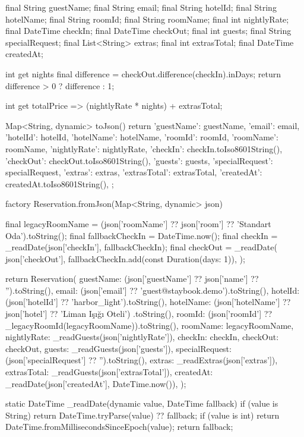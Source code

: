 \documentclass[11pt,a4paper]{article}
\begin{document}
\begin{codeblock}
{  final String guestName;
  final String email;
  final String hotelId;
  final String hotelName;
  final String roomId;
  final String roomName;
  final int nightlyRate;
  final DateTime checkIn;
  final DateTime checkOut;
  final int guests;
  final String specialRequest;
  final List<String> extras;
  final int extrasTotal;
  final DateTime createdAt;

  int get nights {
    final difference = checkOut.difference(checkIn).inDays;
    return difference > 0 ? difference : 1;
  }

  int get totalPrice => (nightlyRate * nights) + extrasTotal;

  Map<String, dynamic> toJson() {
    return {
      'guestName': guestName,
      'email': email,
      'hotelId': hotelId,
      'hotelName': hotelName,
      'roomId': roomId,
      'roomName': roomName,
      'nightlyRate': nightlyRate,
      'checkIn': checkIn.toIso8601String(),
      'checkOut': checkOut.toIso8601String(),
      'guests': guests,
      'specialRequest': specialRequest,
      'extras': extras,
      'extrasTotal': extrasTotal,
      'createdAt': createdAt.toIso8601String(),
    };
  }

  factory Reservation.fromJson(Map<String, dynamic> json) {
    final legacyRoomName =
        (json['roomName'] ?? json['room'] ?? 'Standart Oda').toString();
    final fallbackCheckIn = DateTime.now();
    final checkIn = _readDate(json['checkIn'], fallbackCheckIn);
    final checkOut = _readDate(
      json['checkOut'],
      fallbackCheckIn.add(const Duration(days: 1)),
    );

    return Reservation(
      guestName: (json['guestName'] ?? json['name'] ?? '').toString(),
      email: (json['email'] ?? 'guest@staybook.demo').toString(),
      hotelId: (json['hotelId'] ?? 'harbor_light').toString(),
      hotelName: (json['hotelName'] ?? json['hotel'] ?? 'Liman Işığı Oteli')
          .toString(),
      roomId: (json['roomId'] ?? _legacyRoomId(legacyRoomName)).toString(),
      roomName: legacyRoomName,
      nightlyRate: _readGuests(json['nightlyRate']),
      checkIn: checkIn,
      checkOut: checkOut,
      guests: _readGuests(json['guests']),
      specialRequest: (json['specialRequest'] ?? '').toString(),
      extras: _readExtras(json['extras']),
      extrasTotal: _readGuests(json['extrasTotal']),
      createdAt: _readDate(json['createdAt'], DateTime.now()),
    );
  }

  static DateTime _readDate(dynamic value, DateTime fallback) {
    if (value is String) {
      return DateTime.tryParse(value) ?? fallback;
    }
    if (value is int) {
      return DateTime.fromMillisecondsSinceEpoch(value);
    }
    return fallback;
  }

}
\end{codeblock}
\end{document}
